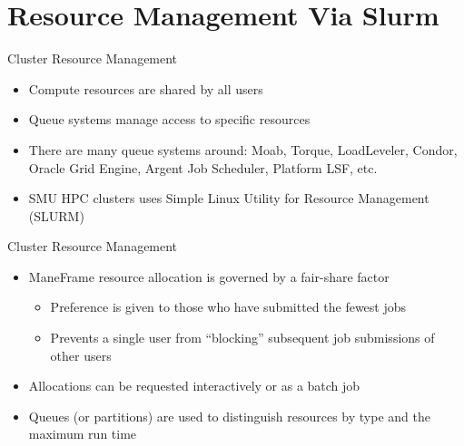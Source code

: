 \section{Resource Management Via Slurm}

\begin{frame}{Cluster Resource Management}
\begin{itemize}
\item Compute resources are shared by all users
\item Queue systems manage access to specific resources
\item There are many queue systems around: Moab, Torque, LoadLeveler, Condor,
      Oracle Grid Engine, Argent Job Scheduler, Platform LSF, etc.
\item SMU HPC clusters uses Simple Linux Utility for Resource Management
      (SLURM)
\end{itemize}
\end{frame}

\begin{frame}{Cluster Resource Management}
\begin{itemize}
\item ManeFrame resource allocation is governed by a fair-share factor
\begin{itemize}
\item Preference is given to those who have submitted the fewest jobs
\item Prevents a single user from “blocking” subsequent job submissions of
      other users
\end{itemize}
\item Allocations can be requested interactively or as a batch job
\item Queues (or partitions) are used to distinguish resources by type and the
      maximum run time
\end{itemize}
\end{frame}


